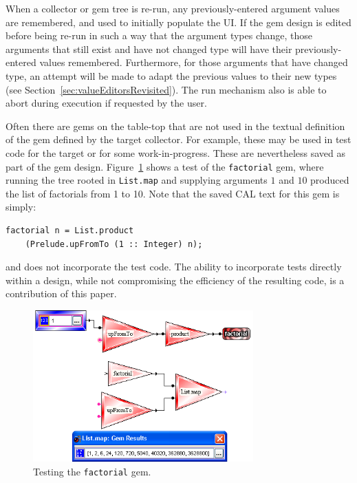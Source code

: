 \documentclass[preprint]{sigplanconf}
\begin{document}
When a collector or gem tree is re-run, any previously-entered
argument values are remembered, and used to initially populate the
UI. If the gem design is edited before being re-run in such a 
way that the argument types change, those arguments that still 
exist and have not changed type will have their previously-entered 
values remembered. Furthermore, for those arguments that have changed type, 
an attempt will be made to adapt the previous values to their new types 
(see Section~\ref{sec:valueEditorsRevisited}). 
The run mechanism also is able to abort during
execution if requested by the user.

Often there are gems on the table-top that are not used in the textual 
definition of the gem defined by the target collector. For example, these may be used in test code for
the target or for some work-in-progress. These are nevertheless saved as part
of the gem design. Figure~\ref{fig:factorialTesting} shows a test of the
{\tt factorial} gem, where running the tree rooted in {\tt List.map}
and supplying arguments $1$ and $10$ produced the list of factorials from 1 to
10. Note that the saved CAL text for this gem is simply:
\begin{verbatim}
factorial n = List.product
    (Prelude.upFromTo (1 :: Integer) n);
\end{verbatim}
and does not incorporate the test code. The ability to incorporate
tests directly within a design, while not compromising the efficiency
of the resulting code, is a contribution of this paper.

\begin{figure}[htb]
  \centering
  \includegraphics[width=20pc]{factorialTesting.png}
  \caption{Testing the {\tt factorial} gem.}
  \label{fig:factorialTesting}
\end{figure}
\end{document}
